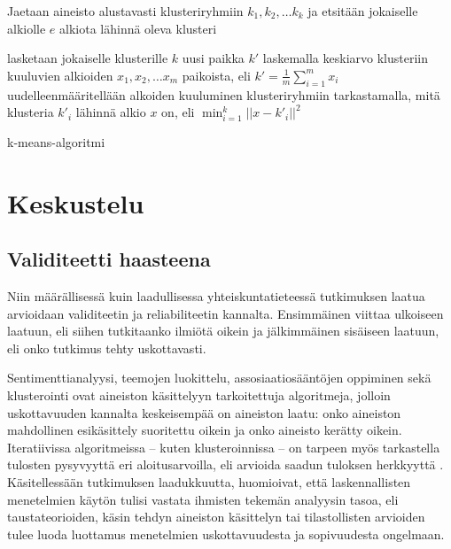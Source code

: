 \documentclass[finnish,gradu,twoside,12pt]{tktltiki}
\begin{document}
{\begin{algorithm}
\begin{algorithmic}

\State Jaetaan aineisto alustavasti klusteriryhmiin $k_1, k_2, \ldots k_k$ ja etsitään jokaiselle alkiolle $e$ alkiota lähinnä oleva klusteri


\State lasketaan jokaiselle klusterille $k$ uusi paikka $k'$ laskemalla keskiarvo klusteriin kuuluvien alkioiden $x_{1}, x_{2}, \ldots x_{m}$ paikoista, eli $k' = \frac{1}{m} \sum_{i=1}^m x_i $
\State uudelleenmääritellään alkoiden kuuluminen klusteriryhmiin tarkastamalla, mitä klusteria $k'_i$ lähinnä alkio $x$ on, eli $\min_{i=1}^k || x - k'_i || ^ 2$

\EndWhile

\end{algorithmic}
\caption{k-means-algoritmi}
\label{algo:kmeans}
\end{algorithm}


\section{Keskustelu}

\subsection{Validiteetti haasteena}

Niin määrällisessä kuin laadullisessa yhteiskuntatieteessä tutkimuksen laatua arvioidaan validiteetin ja reliabiliteetin kannalta. Ensimmäinen viittaa ulkoiseen laatuun, eli siihen tutkitaanko ilmiötä oikein ja jälkimmäinen sisäiseen laatuun, eli onko tutkimus tehty uskottavasti.

Sentimenttianalyysi, teemojen luokittelu, assosiaatiosääntöjen oppiminen sekä klusterointi ovat aineiston käsittelyyn tarkoitettuja algoritmeja, jolloin uskottavuuden kannalta keskeisempää on aineiston laatu: onko aineiston mahdollinen esikäsittely suoritettu oikein ja onko aineisto kerätty oikein. Iteratiivissa algoritmeissa -- kuten klusteroinnissa -- on tarpeen myös tarkastella tulosten pysyvyyttä eri aloitusarvoilla, eli arvioida saadun tuloksen herkkyyttä . Käsitellessään tutkimuksen laadukkuutta, \citet{Grimmer2013} huomioivat, että laskennallisten menetelmien käytön tulisi vastata ihmisten tekemän analyysin tasoa, eli taustateorioiden, käsin tehdyn aineiston käsittelyn tai tilastollisten arvioiden tulee luoda luottamus menetelmien uskottavuudesta ja sopivuudesta ongelmaan.

}
\end{document}
